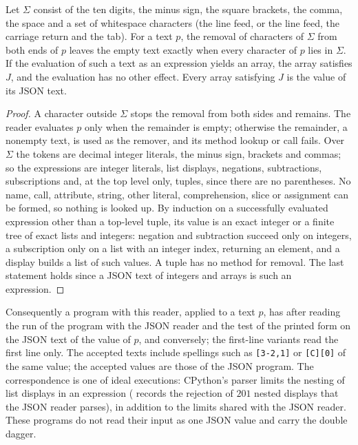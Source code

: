 \begin{lemma}\label{cert:lem:reader}
Let $\Sigma$ consist of the ten digits, the minus sign, the square brackets, the comma, the
space and a set of whitespace characters (the line feed, or the line feed, the carriage
return and the tab). For a text $p$, the removal of characters of $\Sigma$ from both ends
of $p$ leaves the empty text exactly when every character of $p$ lies in $\Sigma$. If the
evaluation of such a text as an expression yields an array, the array satisfies $J$, and
the evaluation has no other effect. Every array satisfying $J$ is the value of its JSON
text.
\end{lemma}
\begin{proof}
A character outside $\Sigma$ stops the removal from both sides and remains. The reader
evaluates $p$ only when the remainder is empty; otherwise the remainder, a nonempty text,
is used as the remover, and its method lookup or call fails. Over $\Sigma$ the tokens are
decimal integer literals, the minus sign, brackets and commas; so the expressions are
integer literals, list displays, negations, subtractions, subscriptions and, at the top
level only, tuples, since there are no parentheses. No name, call, attribute, string,
other literal, comprehension, slice or assignment can be formed, so nothing is looked
up. By induction on a successfully evaluated expression other than a top-level tuple, its
value is an exact integer or a finite tree of exact lists and integers: negation and
subtraction succeed only on integers, a subscription only on a list with an integer
index, returning an element, and a display builds a list of such values. A tuple has no
method for removal. The last statement holds since a JSON text of integers and arrays is
such an expression.
\end{proof}

Consequently a program with this reader, applied to a text $p$, has after reading the run
of the program with the JSON reader and the test of the printed form on the JSON text of
the value of $p$, and conversely; the first-line variants read the first line only. The
accepted texts include spellings such as \texttt{[3-2,1]} or \texttt{[C][0]} of the same
value; the accepted values are those of the JSON program. The correspondence is one of
ideal executions: CPython's parser limits the nesting of list displays in an expression
( records the rejection of $201$ nested displays that the JSON
reader parses), in addition to the limits shared with the JSON reader. These programs do
not read their input as one JSON value and carry the double dagger.

